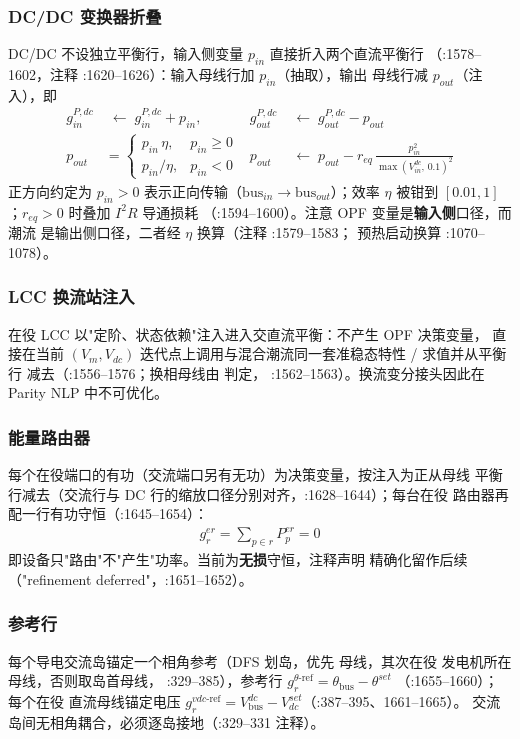 \subsubsection*{DC/DC 变换器折叠}
DC/DC 不设独立平衡行，输入侧变量 $p_{in}$ 直接折入两个直流平衡行
（:1578--1602，注释 :1620--1626）：输入母线行加 $p_{in}$（抽取），输出
母线行减 $p_{out}$（注入），即
\begin{align*}
g^{P,dc}_{in}&\;\leftarrow\;g^{P,dc}_{in}+p_{in},
&g^{P,dc}_{out}&\;\leftarrow\;g^{P,dc}_{out}-p_{out}\\
p_{out}&=\begin{cases}p_{in}\,\eta,&p_{in}\ge 0\\ p_{in}/\eta,&p_{in}<0\end{cases}
&p_{out}&\;\leftarrow\;p_{out}-r_{eq}\,\frac{p_{in}^2}{\max(V^{dc}_{in},\,0.1)^2}
\end{align*}
正方向约定为 $p_{in}>0$ 表示正向传输（$\mathrm{bus}_{in}\to\mathrm{bus}_{out}$）；效率
$\eta$ 被钳到 $[0.01,1]$；$r_{eq}>0$ 时叠加 $I^2R$ 导通损耗
（:1594--1600）。注意 OPF 变量是\textbf{输入侧}口径，而潮流
 是输出侧口径，二者经 $\eta$ 换算（注释 :1579--1583；
预热启动换算 :1070--1078）。

\subsubsection*{LCC 换流站注入}
在役 LCC 以"定阶、状态依赖"注入进入交直流平衡：不产生 OPF 决策变量，
直接在当前 $(V_m,V_{dc})$ 迭代点上调用与混合潮流同一套准稳态特性
/ 求值并从平衡行
减去（:1556--1576；换相母线由  判定，
:1562--1563）。换流变分接头因此在 Parity NLP 中不可优化。

\subsubsection*{能量路由器}
每个在役端口的有功（交流端口另有无功）为决策变量，按注入为正从母线
平衡行减去（交流行与 DC 行的缩放口径分别对齐，:1628--1644）；每台在役
路由器再配一行有功守恒（:1645--1654）：
\begin{align*}
g^{er}_r=\sum_{p\in r}P^{er}_p=0
\end{align*}
即设备只"路由"不"产生"功率。当前为\textbf{无损}守恒，注释声明
 精确化留作后续（"refinement deferred"，:1651--1652）。

\subsubsection*{参考行}
每个导电交流岛锚定一个相角参考（DFS 划岛，优先 
母线，其次在役  发电机所在母线，否则取岛首母线，
:329--385），参考行 $g^{\theta\text{-ref}}_r=\theta_{\mathrm{bus}}-\theta^{set}$
（:1655--1660）；每个在役  直流母线锚定电压
$g^{vdc\text{-ref}}_r=V^{dc}_{\mathrm{bus}}-V^{set}_{dc}$（:387--395、1661--1665）。
交流岛间无相角耦合，必须逐岛接地（:329--331 注释）。

